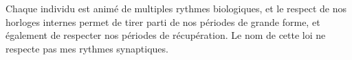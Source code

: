 %
    {Chaque individu est animé de multiples rythmes biologiques, et le respect de nos horloges internes permet de tirer parti de nos périodes de grande forme, et également de respecter nos périodes de récupération.}%
    {Le nom de cette loi ne respecte pas mes rythmes synaptiques.}
